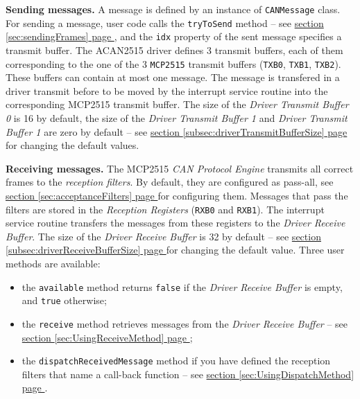 \documentclass[10pt, a4paper, obeyspaces, openany]{extarticle}
\newcommand\refSectionPage[1]{\hyperref[sec:#1]{section \ref*{sec:#1} page \pageref{sec:#1}}}
\newcommand\refSubsectionPage[1]{\hyperref[subsec:#1]{section \ref*{subsec:#1} page \pageref{subsec:#1}}}
\begin{document}
{\bf Sending messages.} A message is defined by an instance of \texttt{CANMessage} class. For sending a message, user code calls the \texttt{tryToSend} method -- see \refSectionPage{sendingFrames}, and the \texttt{idx} property of the sent message specifies a transmit buffer. The ACAN2515 driver defines 3 transmit buffers, each of them corresponding to the one of the 3 \texttt{MCP2515} transmit buffers (\texttt{TXB0}, \texttt{TXB1}, \texttt{TXB2}). These buffers can contain at most one message. The message is  transfered in a driver transmit before to be moved by the interrupt service routine into the corresponding MCP2515 transmit buffer. The size of the \emph{Driver Transmit Buffer 0} is 16 by default, the size of the \emph{Driver Transmit Buffer 1} and \emph{Driver Transmit Buffer 1} are zero by default  -- see \refSubsectionPage{driverTransmitBufferSize} for changing the default values.



{\bf Receiving messages.} The MCP2515 \emph{CAN Protocol Engine} transmits all correct frames to the \emph{reception filters}. By default, they are configured as pass-all, see \refSectionPage{acceptanceFilters} for configuring them. Messages that pass the filters are stored in the \emph{Reception Registers} (\texttt{RXB0} and \texttt{RXB1}). The interrupt service routine transfers the messages from these registers to the \emph{Driver Receive Buffer}. The size of the \emph{Driver Receive Buffer} is 32 by default -- see \refSubsectionPage{driverReceiveBufferSize} for changing the default value. Three user methods are available:
\begin{itemize}
  \item the \texttt{available} method returns \texttt{false} if the \emph{Driver Receive Buffer} is empty, and \texttt{true} otherwise;
  \item the \texttt{receive} method retrieves messages from the \emph{Driver Receive Buffer} -- see \refSectionPage{UsingReceiveMethod};
  \item the \texttt{dispatchReceivedMessage} method if you have defined the reception filters that name a call-back function -- see \refSectionPage{UsingDispatchMethod}.
\end{itemize}
\end{document}
